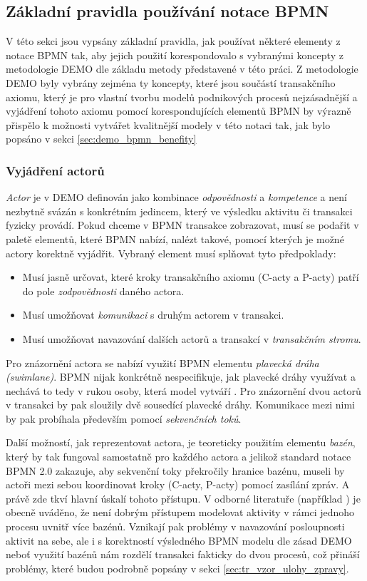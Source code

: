 \subsection{Základní pravidla používání notace BPMN} \label{sec:zakladni_pravidla}
V této sekci jsou vypsány základní pravidla, jak používat některé elementy z notace BPMN tak, aby jejich použití korespondovalo s vybranými koncepty z metodologie DEMO dle základu metody představené v této práci. Z metodologie DEMO byly vybrány zejména ty koncepty, které jsou součástí transakčního axiomu, který je pro vlastní tvorbu modelů podnikových procesů nejzásadnější a vyjádření tohoto axiomu pomocí korespondujících elementů BPMN by výrazně přispělo k možnosti vytvářet kvalitnější modely v této notaci tak, jak bylo popsáno v sekci \ref{sec:demo_bpmn_benefity}
\subsubsection{Vyjádření actorů}
\textit{Actor} je v DEMO definován jako kombinace \textit{odpovědnosti} a \textit{kompetence} a není nezbytně svázán s konkrétním jedincem, který ve výsledku aktivitu či transakci fyzicky provádí. Pokud chceme v BPMN transakce zobrazovat, musí se podařit v paletě elementů, které BPMN nabízí, nalézt takové, pomocí kterých je možné actory korektně vyjádřit. Vybraný element musí splňovat tyto předpoklady:

\begin{itemize}
\item Musí jasně určovat, které kroky transakčního axiomu (C-acty a P-acty) patří do pole \textit{zodpovědnosti} daného actora.
\item Musí umožňovat \textit{komunikaci} s druhým actorem v transakci.
\item Musí umožňovat navazování dalších actorů a transakcí v \textit{transakčním stromu}.
\end{itemize}

Pro znázornění actora se nabízí využití BPMN elementu \textit{plavecká dráha (swimlane)}. BPMN nijak konkrétně nespecifikuje, jak plavecké dráhy využívat a nechává to tedy v rukou osoby, která model vytváří \cite{Silver2011}. Pro znázornění dvou actorů v transakci by pak sloužily dvě sousedící plavecké dráhy. Komunikace mezi nimi by pak probíhala především pomocí \textit{sekvenčních toků}.

Další možností, jak reprezentovat actora, je teoreticky použitím elementu \textit{bazén}, který by tak fungoval samostatně pro každého actora a jelikož standard notace BPMN 2.0 zakazuje, aby sekvenční toky překročily hranice bazénu, museli by actoři mezi sebou koordinovat kroky (C-acty, P-acty) pomocí zasílání zpráv. A právě zde tkví hlavní úskalí tohoto přístupu. V odborné literatuře (například \cite{Silver2011}) je obecně uváděno, že není dobrým přístupem modelovat aktivity v rámci jednoho procesu uvnitř více bazénů. Vznikají pak problémy v navazování posloupnosti aktivit na sebe, ale i s korektností výsledného BPMN modelu dle zásad DEMO neboť využití bazénů nám rozdělí transakci fakticky do dvou procesů, což přináší problémy, které budou podrobně popsány v sekci \ref{sec:tr_vzor_ulohy_zpravy}.

